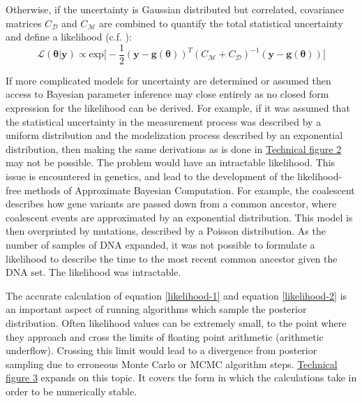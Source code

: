 Otherwise, if the uncertainty is Gaussian distributed but correlated, covariance matrices $C_{\mathcal{D}}$ and $C_{\mathcal{M}}$ are combined to quantify the total statistical uncertainty and define a likelihood (c.f. \citet[p.35-36]{Tarantola2005}):
\begin{equation}
\mathcal{L}(\bm{\theta}|\bm{y}) \propto \text{exp}\bigg[-\frac{1}{2}(\bm{y}-\bm{g}(\bm{\theta}))^T(C_{\mathcal{M}}+C_{\mathcal{D}})^{-1}(\bm{y}-\bm{g}(\bm{\theta}))\bigg]
\label{likelihood-2}
\end{equation}
\newpage

If more complicated models for uncertainty are determined or assumed then access to Bayesian parameter inference may close entirely as no closed form expression for the likelihood can be derived. For example, if it was assumed that the statistical uncertainty in the measurement process was described by a uniform distribution and the modelization process described by an exponential distribution, then making the same derivations as is done in \hyperref[tf1]{Technical figure 2} may not be possible. The problem would have an intractable likelihood. This issue is encountered in genetics, and lead to the development of the likelihood-free methods of Approximate Bayesian Computation. For example, the coalescent \citep{Marjoram2006} describes how gene variants are passed down from a common ancestor, where coalescent events are approximated by an exponential distribution. This model is then overprinted by mutations, described by a Poisson distribution. As the number of samples of DNA expanded, it was not possible to formulate a likelihood to describe the time to the most recent common ancestor given the DNA set. The likelihood was intractable.\par



The accurate calculation of equation \ref{likelihood-1} and equation \ref{likelihood-2} is an important aspect of running algorithms which sample the posterior distribution. Often likelihood values can be extremely small, to the point where they approach and cross the limits of floating point arithmetic (arithmetic underflow). Crossing this limit would lead to a divergence from posterior sampling due to erroneous Monte Carlo or MCMC algorithm steps. \hyperref[tf3]{Technical figure 3} expands on this topic. It covers the form in which the calculations take in order to be numerically stable.\par

